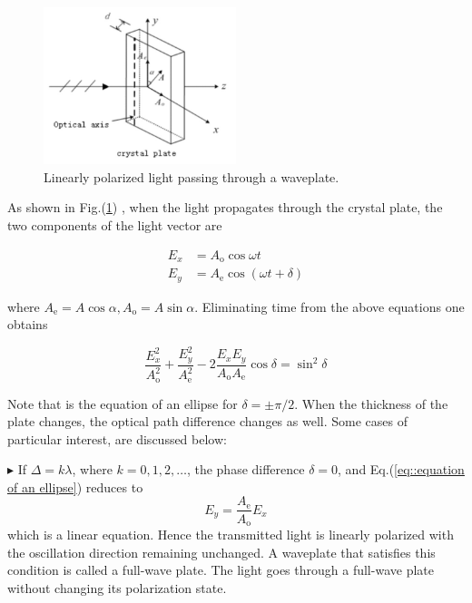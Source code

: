\documentclass[a4paper]{article}
\begin{document}
\begin{figure}[!htbp]
	\centering
	\includegraphics[width=0.5\textwidth]{waveplate.png}
	\caption{Linearly polarized light passing through a waveplate.}
	\label{fig::waveplate}
\end{figure}

As shown in Fig.(\ref{fig::waveplate}) , when the light propagates through the crystal plate, the two components of the light vector are

\begin{align*}
	E_{x} & =A_{\mathrm{o}} \cos \omega t          \\
	E_{y} & =A_{\mathrm{e}} \cos (\omega t+\delta)
\end{align*}

where $A_{\mathrm{e}}=A \cos \alpha, A_{\mathrm{o}}=A \sin \alpha$. Eliminating time from the above equations one obtains

\begin{equation}
	\frac{E_{x}^{2}}{A_{\mathrm{o}}^{2}}+\frac{E_{y}^{2}}{A_{\mathrm{e}}^{2}}-2 \frac{E_{x} E_{y}}{A_{\mathrm{o}} A_{\mathrm{e}}} \cos \delta=\sin ^{2} \delta
	\label{eq::equation of an ellipse}
\end{equation}

Note that is the equation of an ellipse for $\delta=\pm \pi / 2$.
When the thickness of the plate changes, the optical path difference changes as well. Some cases of particular interest, are discussed below:

$\blacktriangleright$ If $\Delta=k \lambda$, where $k=0,1,2, \ldots$, the phase difference $\delta=0$, and Eq.(\ref{eq::equation of an ellipse}) reduces to
$$
	E_{y}=\frac{A_{\mathrm{e}}}{A_{\mathrm{o}}} E_{x}
$$
which is a linear equation. Hence the transmitted light is linearly polarized with the oscillation direction remaining unchanged. A waveplate that satisfies
this condition is called a full-wave plate. The light goes through a full-wave plate without changing its polarization state.
\end{document}
